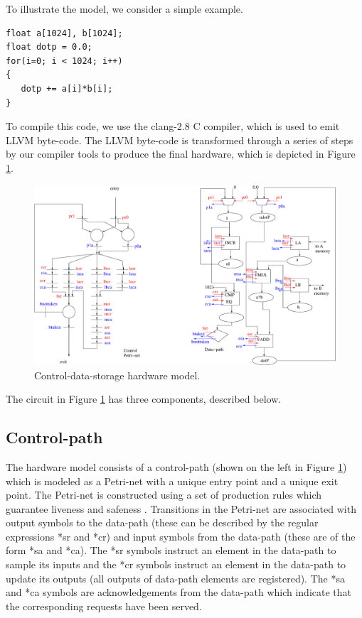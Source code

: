 \documentclass[conference]{IEEEtran}
\begin{document}
To illustrate the model, we consider a simple example.
\begin{verbatim}
float a[1024], b[1024];
float dotp = 0.0;
for(i=0; i < 1024; i++)
{
   dotp += a[i]*b[i];
}
\end{verbatim}
To compile this code, we use the clang-2.8 \cite{clang} C compiler, 
which is used to emit LLVM \cite{llvm} byte-code.  The LLVM byte-code
is transformed through a series of steps by our compiler tools to
produce the final hardware, which is depicted in Figure \ref{fig:dotP}.
\begin{figure}[ht]
  \centering
  \includegraphics[width=15cm]{dotP.eps}
  \caption{Control-data-storage hardware model.}
  \label{fig:dotP}
\end{figure}
The circuit in Figure \ref{fig:dotP} has three components,
described below.

\subsection{Control-path}


The hardware model consists of a control-path (shown on the left
in Figure \ref{fig:dotP}) which is modeled as a Petri-net with
a unique entry point and a unique exit point.  The Petri-net
is constructed using a set of production rules which guarantee
liveness and safeness \cite{ahir}.  Transitions in the Petri-net
are associated with output symbols to the data-path (these can
be described by the regular expressions *sr and *cr)
and input symbols from the data-path (these are of the form *sa and
*ca).  The *sr symbols instruct an element in the data-path to
sample its inputs and the *cr symbols instruct an element in the
data-path to update its outputs (all outputs of data-path elements
are registered).  The *sa and *ca symbols are acknowledgements
from the data-path which indicate that the corresponding requests
have been served.  
\end{document}
